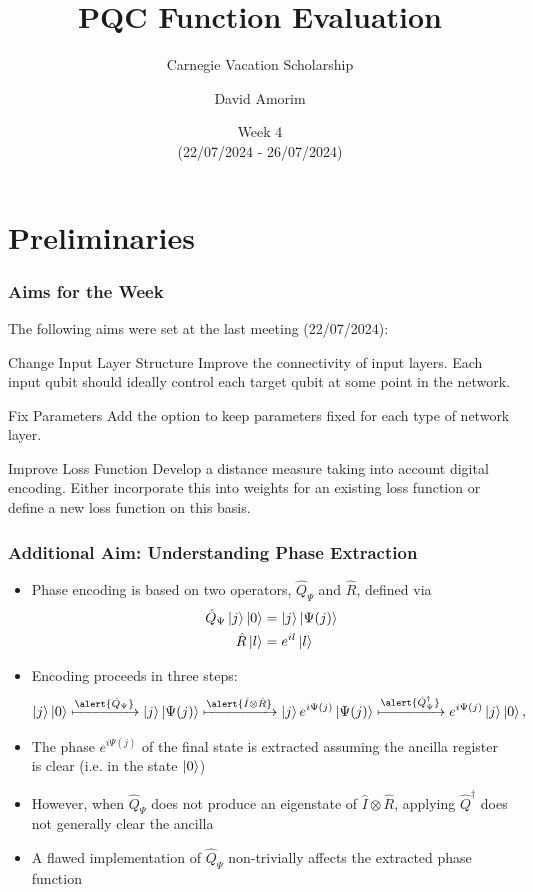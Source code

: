 \documentclass{beamer}
\title[PQC Function Evaluation]{PQC Function Evaluation}
\subtitle{Carnegie Vacation Scholarship}
\author[David Amorim]{David Amorim}
\institute[]{}
\date[29/07/2024]{Week 4 \\(22/07/2024 - 26/07/2024)}
\begin{document}
\frame{\titlepage}

\section{Preliminaries}
\begin{frame}
\frametitle{Aims for the Week}
The following aims were set at the last meeting (22/07/2024):

\begin{alertblock}{Change Input Layer Structure}
Improve the connectivity of input layers. Each input qubit should ideally control each target qubit at some point in the network. 
\end{alertblock}

\begin{alertblock}{Fix Parameters}
Add the option to keep parameters fixed for each type of network layer. 
\end{alertblock}

\begin{alertblock}{Improve Loss Function}
Develop a distance measure taking into account digital encoding. Either incorporate this into weights for an existing loss function or define a new loss function on this basis. 
\end{alertblock}
\end{frame}

\begin{frame}
\frametitle{Additional Aim: Understanding Phase Extraction}
\begin{itemize}
\item Phase encoding is based on two operators, \alert{$\hat{Q}_\Psi$ and $\hat{R}$}, defined via 
\begin{align}
\hat{Q}_\Psi \ket{j}\ket{0} &= \ket{j}\ket{\Psi(j)} \\
\hat{R} \ket{l} &= e^{i l} \ket{l}
\end{align}
\item Encoding proceeds in \alert{three steps}:
\begin{equation}
\ket{j}\ket{0}\xmapsto{\alert{\hat{Q}_\Psi}} \ket{j}\ket{\Psi(j)} \xmapsto{\alert{\hat{I} \otimes \hat{R}}} \ket{j} e^{i \Psi(j)} \ket{\Psi(j)} \xmapsto{\alert{\hat{Q}_\Psi^\dagger}} e^{i \Psi (j)} \ket{j} \ket{0}, 
\end{equation}
\item The phase $e^{i \Psi (j)}$ of the final state is extracted \alert{assuming the ancilla register is clear} (i.e. in the state $\ket{0}$)
\item However, when $\hat{Q}_\Psi$ does not produce an eigenstate of $\hat{I} \otimes \hat{R}$, applying $\hat{Q}^\dagger$ does not generally clear the ancilla
\item  A flawed implementation of $\hat{Q}_\Psi$ \alert{non-trivially affects the extracted phase function} 
\end{itemize}
\end{frame}
\end{document}
